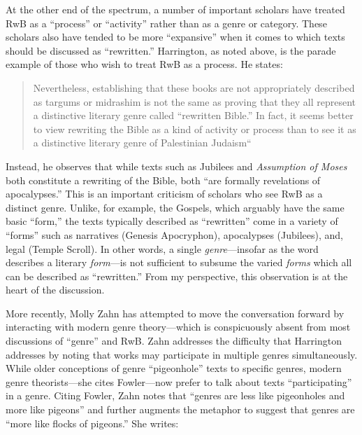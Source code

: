 At the other end of the spectrum, a number of important scholars have
treated RwB as a ``process'' or ``activity'' rather than as a genre or
category. These scholars also have tended to be more ``expansive'' when
it comes to which texts should be discussed as ``rewritten.''
Harrington, as noted above, is the parade example of those who wish to
treat RwB as a process. He states:

\begin{quote}
Nevertheless, establishing that these books are not appropriately
described as targums or midrashim is not the same as proving that they
all represent a distinctive literary genre called ``rewritten Bible.''
In fact, it seems better to view rewriting the Bible as a kind of
activity or process than to see it as a distinctive literary genre of
Palestinian
Judaism``\autocite[242--243]{harrington_kraft-nickelsburg1986}
\end{quote}

Instead, he observes that while texts such as Jubilees and
\emph{Assumption of Moses} both constitute a rewriting of the Bible,
both ``are formally revelations of
apocalypses.''\autocite[243]{harrington_kraft-nickelsburg1986} This is
an important criticism of scholars who see RwB as a distinct genre.
Unlike, for example, the Gospels, which arguably have the same basic
``form,'' the texts typically described as ``rewritten'' come in a
variety of ``forms'' such as narratives (Genesis Apocryphon),
apocalypses (Jubilees), and, legal (Temple Scroll). In other words, a
single \emph{genre}---insofar as the word describes a literary
\emph{form}---is not sufficient to subsume the varied \emph{forms} which
all can be described as ``rewritten.'' From my perspective, this
observation is at the heart of the discussion.

More recently, Molly Zahn has attempted to move the conversation forward
by interacting with modern genre theory---which is conspicuously absent
from most discussions of ``genre'' and
RwB.\autocites{zahn_jbl2012}[Daniel Machiela noted the absence of genre
theory in his 2010 article, as well, see][]{machiela_jjs2010}[Notable
exceptions include][]{brooke_dsd2010} Zahn addresses the difficulty that
Harrington addresses by noting that works may participate in multiple
genres simultaneously. While older conceptions of genre ``pigeonhole''
texts to specific genres, modern genre theorists---she cites
Fowler---now prefer to talk about texts ``participating'' in a genre.
Citing Fowler, Zahn notes that ``genres are less like pigeonholes and
more like pigeons'' and further augments the metaphor to suggest that
genres are ``more like flocks of pigeons.'' She writes:

